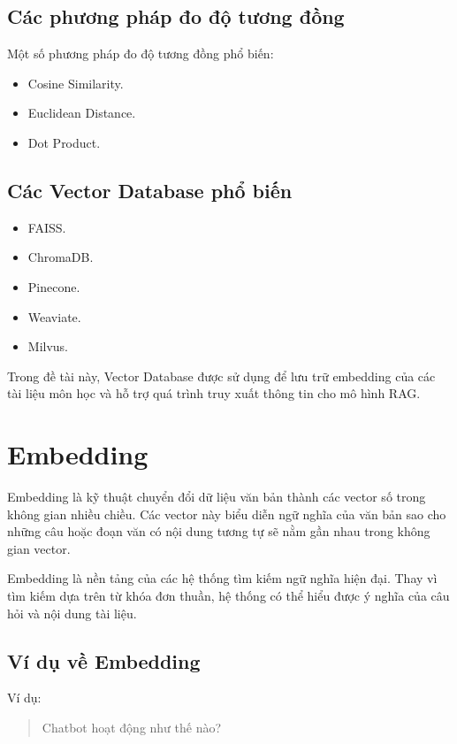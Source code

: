 \documentclass[12pt,a4paper]{report}
\begin{document}
	\subsection{Các phương pháp đo độ tương đồng}
	
	Một số phương pháp đo độ tương đồng phổ biến:
	
	\begin{itemize}
		\item Cosine Similarity.
		\item Euclidean Distance.
		\item Dot Product.
	\end{itemize}
	
	\subsection{Các Vector Database phổ biến}
	
	\begin{itemize}
		\item FAISS.
		\item ChromaDB.
		\item Pinecone.
		\item Weaviate.
		\item Milvus.
	\end{itemize}
	
	Trong đề tài này, Vector Database được sử dụng để lưu trữ embedding của các tài liệu môn học và hỗ trợ quá trình truy xuất thông tin cho mô hình RAG.
	
	\section{Embedding}
	
	Embedding là kỹ thuật chuyển đổi dữ liệu văn bản thành các vector số trong không gian nhiều chiều. Các vector này biểu diễn ngữ nghĩa của văn bản sao cho những câu hoặc đoạn văn có nội dung tương tự sẽ nằm gần nhau trong không gian vector.
	
	Embedding là nền tảng của các hệ thống tìm kiếm ngữ nghĩa hiện đại. Thay vì tìm kiếm dựa trên từ khóa đơn thuần, hệ thống có thể hiểu được ý nghĩa của câu hỏi và nội dung tài liệu.
	
	\subsection{Ví dụ về Embedding}
	
	Ví dụ:
	
	\begin{quote}
		Chatbot hoạt động như thế nào?
	\end{quote}
	
\end{document}
